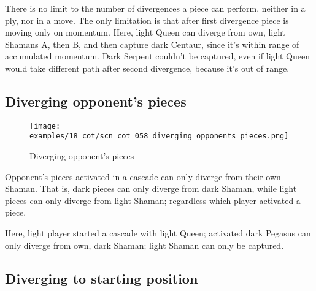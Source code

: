 \vspace*{-0.5\baselineskip}
There is no limit to the number of divergences a piece can perform, neither in a ply,
nor in a move. The only limitation is that after first divergence piece is moving
only on momentum.\newline
\indent
Here, light Queen can diverge from own, light Shamans A, then B, and then capture
dark Centaur, since it's within range of accumulated momentum. Dark Serpent couldn't
be captured, even if light Queen would take different path after second divergence,
because it's out of range.

\clearpage %

\subsection*{Diverging opponent's pieces}
\label{sec:Conquest of Tlalocan/Divergence/Diverging opponent's pieces}

\vspace*{-1.4\baselineskip}
\noindent
\begin{figure}[!h]
\texttt{[image: examples/18\_cot/scn\_cot\_058\_diverging\_opponents\_pieces.png]}
\vspace*{-1.3\baselineskip}
\caption{Diverging opponent's pieces}
\label{fig:scn_cot_058_diverging_opponents_pieces}
\end{figure}

\vspace*{-0.5\baselineskip}
Opponent's pieces activated in a cascade can only diverge from their own Shaman.
That is, dark pieces can only diverge from dark Shaman, while light pieces can only
diverge from light Shaman; regardless which player activated a piece.

Here, light player started a cascade with light Queen; activated dark Pegasus
can only diverge from own, dark Shaman; light Shaman can only be captured.

\clearpage %

\subsection*{Diverging to starting position}
\label{sec:Conquest of Tlalocan/Divergence/Diverging to starting position}

